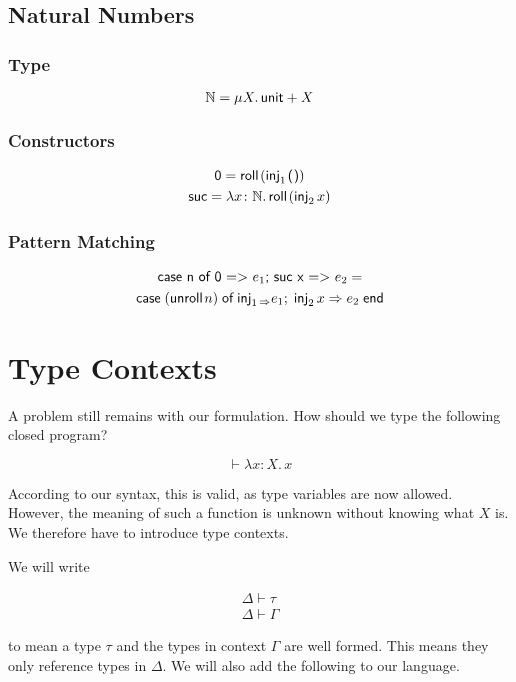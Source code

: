\documentclass{lecturenotes}
\newcommand{\tabs}[3]{\ensuremath{\lambda #1 \colon #2.\,#3}}
\newcommand{\utype}{\textsf{unit}\xspace}
\newcommand{\unit}{\ensuremath{\textsf{(}\mkern0.5mu\textsf{)}}}
\newcommand{\sumtype}[2]{\ensuremath{#1 + #2}}
\newcommand{\injl}[1]{\ensuremath{\textsf{inj}_1\mkern2mu#1}}
\newcommand{\injr}[1]{\ensuremath{\textsf{inj}_2\mkern3mu#1}}
\newcommand{\case}[5]{\ensuremath{\textsf{case}\mkern5mu#1\mkern5mu\textsf{of}\mkern5mu\injl{#2} \Rightarrow #3;\mkern5mu\injr{#4} \Rightarrow #5\mkern5mu\textsf{end}}}
\newcommand{\rectype}[2]{\ensuremath{\mu #1.\,#2}}
\newcommand{\roll}[1]{\textsf{roll}\mkern2mu#1}
\newcommand{\unroll}[1]{\textsf{unroll}\mkern2mu#1}
\begin{document}
\subsection{Natural Numbers}
\subsubsection{Type}

\[
  \mathbb{N} = \textsf{\rectype{X}{\sumtype{\utype}{X}}}
\]

\subsubsection{Constructors}
\begin{gather*}
  \textsf{0} = \roll{(\injl{\unit})}\\
  \textsf{suc} = \tabs{x}{\mathbb{N}}{\roll{(\injr{x})}}
\end{gather*}

\subsubsection{Pattern Matching}
\begin{gather*}
  \textsf{case n of 0 => $e_1$; suc x => $e_2$} =\\
  \textsf{\case{(\unroll{n})}{_}{e_1}{x}{e_2}}
\end{gather*}

\section{Type Contexts}
A problem still remains with our formulation.
How should we type the following closed program?

\[
  \vdash \tabs{x}{X}{x}
\]

According to our syntax, this is valid, as type variables are now allowed.
However, the meaning of such a function is unknown without knowing what $X$ is.
We therefore have to introduce type contexts.

We will write

\begin{gather*}
  \Delta \vdash \tau\\
  \Delta \vdash \Gamma
\end{gather*}

to mean a type $\tau$ and the types in context $\Gamma$ are well formed.
This means they only reference types in $\Delta$.
We will also add the following to our language.
\end{document}
